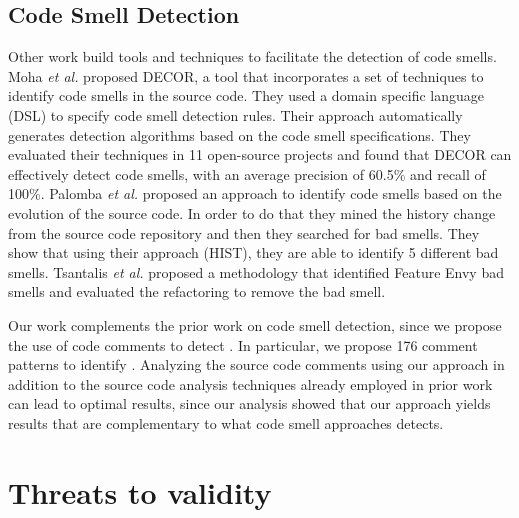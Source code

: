 
\subsection{Code Smell Detection}

Other work build tools and techniques to facilitate the detection of code smells. Moha \textit{et al.} \cite{Moha2010TSE} proposed DECOR, a tool that incorporates a set of techniques to identify code smells in the source code. They used a domain specific language (DSL) to specify code smell detection rules. Their approach automatically generates detection algorithms based on the code smell specifications. They evaluated their techniques in 11 open-source projects and found that DECOR can effectively detect code smells, with an average precision of 60.5\% and recall of 100\%. Palomba \textit{et al.} \cite{Palomba2013} proposed an approach to identify code smells based on the evolution of the source code. In order to do that they mined the history change from the source code repository and then they searched for bad smells. They show that using their approach (HIST), they are able to identify 5 different bad smells. Tsantalis \textit{et al.} \cite{Tsantalis2009TSE} proposed a methodology that identified Feature Envy bad smells and evaluated the refactoring to remove the bad smell.

Our work complements the prior work on code smell detection, since we propose the use of code comments to detect \SADTD. In particular, we propose 176 comment patterns to identify \SADTD. Analyzing the source code comments using our approach in addition to the source code analysis techniques already employed in prior work can lead to optimal results, since our analysis showed that our approach yields results that are complementary to what code smell approaches detects.

\section{Threats to validity}
\label{sec:threats_to_validity}


